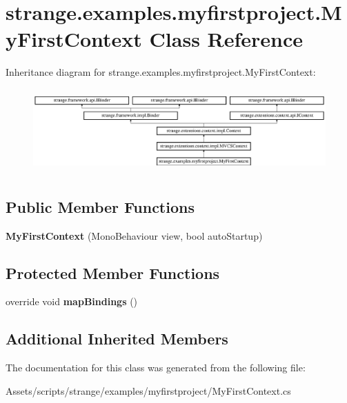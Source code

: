 \hypertarget{classstrange_1_1examples_1_1myfirstproject_1_1_my_first_context}{\section{strange.\-examples.\-myfirstproject.\-My\-First\-Context Class Reference}
\label{classstrange_1_1examples_1_1myfirstproject_1_1_my_first_context}
}
Inheritance diagram for strange.\-examples.\-myfirstproject.\-My\-First\-Context\-:\begin{figure}[H]
\begin{center}
\leavevmode
\includegraphics[height=3.252033cm]{classstrange_1_1examples_1_1myfirstproject_1_1_my_first_context}
\end{center}
\end{figure}
\subsection*{Public Member Functions}
\begin{DoxyCompactItemize}
\item 
\hypertarget{classstrange_1_1examples_1_1myfirstproject_1_1_my_first_context_a650ae40afade818bc9c90757b3032bf3}{{\bfseries My\-First\-Context} (Mono\-Behaviour view, bool auto\-Startup)}\label{classstrange_1_1examples_1_1myfirstproject_1_1_my_first_context_a650ae40afade818bc9c90757b3032bf3}

\end{DoxyCompactItemize}
\subsection*{Protected Member Functions}
\begin{DoxyCompactItemize}
\item 
\hypertarget{classstrange_1_1examples_1_1myfirstproject_1_1_my_first_context_a3c6ca035455fff847f267288882ba62f}{override void {\bfseries map\-Bindings} ()}\label{classstrange_1_1examples_1_1myfirstproject_1_1_my_first_context_a3c6ca035455fff847f267288882ba62f}

\end{DoxyCompactItemize}
\subsection*{Additional Inherited Members}


The documentation for this class was generated from the following file\-:\begin{DoxyCompactItemize}
\item 
Assets/scripts/strange/examples/myfirstproject/My\-First\-Context.\-cs\end{DoxyCompactItemize}
